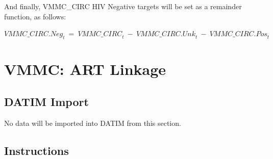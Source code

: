 \documentclass[
  openany]{book}
\begin{document}
And finally, VMMC\_CIRC HIV Negative targets will be set as a remainder
function, as follows:

\begin{center} ${VMMC\_ CIRC.Neg}_{t}\  = \ {VMMC\_ CIRC}_{t}\  - \ {VMMC\_ CIRC.Unk}_{t}\  - \ {VMMC\_ CIRC.Pos}_{t}$ \end{center}

\hypertarget{vmmc-art-linkage}{%
\section{VMMC: ART Linkage}\label{vmmc-art-linkage}}

\begin{table}
\centering\begingroup\fontsize{12}{14}\selectfont

\endgroup{}
\end{table}

\hypertarget{datim-import-30}{%
\subsection{DATIM Import}\label{datim-import-30}}

No data will be imported into DATIM from this section.

\hypertarget{instructions-30}{%
\subsection{Instructions}\label{instructions-30}}
\end{document}
